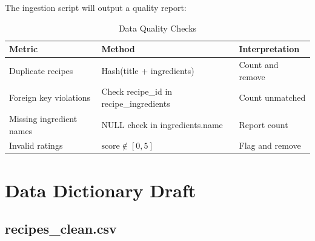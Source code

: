 \documentclass[11pt,a4paper]{article}
\begin{document}
The ingestion script will output a quality report:

\begin{table}[H]
    \centering
    \begin{tabular}{|p{3cm}|p{3cm}|p{4.5cm}|}
        \hline
        \textbf{Metric} & \textbf{Method} & \textbf{Interpretation} \\
        \hline
        Duplicate recipes & Hash(title + ingredients) & Count and remove \\
        \hline
        Foreign key violations & Check recipe\_id in recipe\_ingredients & Count unmatched \\
        \hline
        Missing ingredient names & NULL check in ingredients.name & Report count \\
        \hline
        Invalid ratings & $\text{score} \notin [0, 5]$ & Flag and remove \\
        \hline
    \end{tabular}
    \caption{Data Quality Checks}
    \label{tab:quality_checks}
\end{table}

\newpage

\section{Data Dictionary Draft}

\subsection{recipes\_clean.csv}
\end{document}
